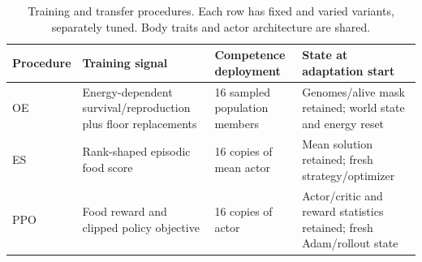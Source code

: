 \begin{table}[tb]
\centering\small
\caption{Training and transfer procedures. Each row has fixed and varied variants, separately tuned. Body traits and actor architecture are shared.}\label{tab:procedures}
\begin{tabularx}{\linewidth}{lYYY}
\toprule
Procedure & Training signal & Competence deployment & State at adaptation start\\\midrule
OE & Energy-dependent survival/reproduction plus floor replacements & 16 sampled population members & Genomes/alive mask retained; world state and energy reset\\
ES & Rank-shaped episodic food score & 16 copies of mean actor & Mean solution retained; fresh strategy/optimizer\\
PPO & Food reward and clipped policy objective & 16 copies of actor & Actor/critic and reward statistics retained; fresh Adam/rollout state\\
\bottomrule
\end{tabularx}
\end{table}
